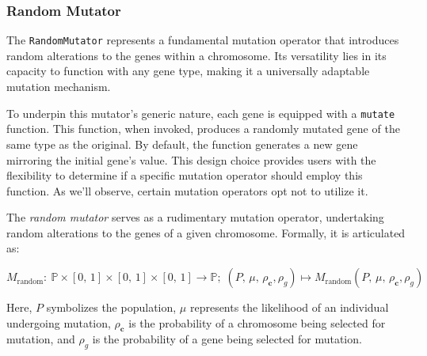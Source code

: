 \subsubsection{Random Mutator}
\label{sec:keen:op:mut:simple}

  The \texttt{RandomMutator} represents a fundamental mutation operator that
  introduces random alterations to the genes within a chromosome. Its versatility 
  lies in its capacity to function with any gene type, making it a universally 
  adaptable mutation mechanism.

  To underpin this mutator's generic nature, each gene is equipped with a
  \texttt{mutate} function. This function, when invoked, produces a randomly 
  mutated gene of the same type as the original. By default, the function 
  generates a new gene mirroring the initial gene's value. This design choice 
  provides users with the flexibility to determine if a specific mutation 
  operator should employ this function. As we'll observe, certain mutation 
  operators opt not to utilize it.

  \begin{definition}
    The \emph{random mutator} serves as a rudimentary mutation operator, 
    undertaking random alterations to the genes of a given chromosome. 
    Formally, it is articulated as:

    \begin{equation}
      M_\mathrm{random} :\: \mathbb{P} \times [0,\, 1] \times [0,\, 1] 
        \times [0,\, 1] \to \mathbb{P};\;
      (P,\, \mu,\, \rho_\textbf{c}, \rho_g) 
        \mapsto M_\mathrm{random}(P,\, \mu,\, \rho_\textbf{c}, \rho_g)
    \end{equation}

    Here, \(P\) symbolizes the population, \(\mu\) represents the likelihood of 
    an individual undergoing mutation, \(\rho_\textbf{c}\) is the probability
    of a chromosome being selected for mutation, and \(\rho_g\) is the
    probability of a gene being selected for mutation.
  \end{definition}


